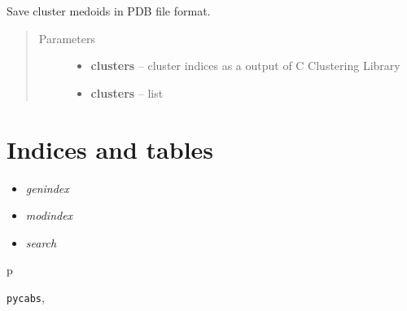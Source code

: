 \documentclass[letterpaper,10pt,english]{sphinxmanual}
\begin{document}

\begin{fulllineitems}
\label{api:pycabs.saveMedoids}
Save cluster medoids in PDB file format.
\begin{quote}\begin{description}
\item[{Parameters}] \leavevmode\begin{itemize}
\item {} 
\textbf{clusters} -- cluster indices as a output of C Clustering Library

\item {} 
\textbf{clusters} -- list

\end{itemize}

\end{description}\end{quote}

\end{fulllineitems}



\chapter{Indices and tables}
\label{index:indices-and-tables}\begin{itemize}
\item {} 
\emph{genindex}

\item {} 
\emph{modindex}

\item {} 
\emph{search}

\end{itemize}


\renewcommand{\indexname}{Python Module Index}
\begin{theindex}
\def\bigletter#1{{\Large\sffamily#1}\nopagebreak\vspace{1mm}}
\bigletter{p}
\item {\texttt{pycabs}}, \pageref{api:module-pycabs}
\end{theindex}

\renewcommand{\indexname}{Index}
\printindex
\end{document}
